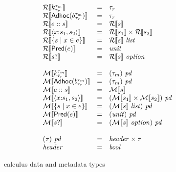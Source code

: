 \begin{figure}

\[
\begin{array}{lcl}
\repty{\Sk} & = & \tau_r \\
\repty{\SAdhoc{b}} & = & \tau_r \\
\repty{\SPath{e}{s}} & = & \repty{s} \\
\repty{\SPair{x}{s_1}{s_2}} & = & \repty{s_1} \times \repty{s_2} \\
\repty{\SSetComp{s}{x}{e}} & = & \repty{s}~\typ{list}  \\
\repty{\SPred{e}} & = & \typ{unit} \\
\repty{\SOption{s}} & = & \repty{s}~\typ{option}  \\
\\
\mdty{\Sk} & = & \pd{\tau_m} \\
\mdty{\SAdhoc{b}} & = & \pd{\tau_m} \\
\mdty{\SPath{e}{s}} & = & \mdty{s} \\
\mdty{\SPair{x}{s_1}{s_2}} & = & \pd{\mdty{s_1} \times \mdty{s_2}} \\
\mdty{\SSetComp{s}{x}{e}} & = & \pd{\mdty{s}~\typ{list}}  \\
\mdty{\SPred{e}} & = & \pd{\typ{unit}} \\
\mdty{\SOption{s}} & = & \pd{\mdty{s}~\typ{option}}  \\
\\
\pd{\tau} & = & \typ{header} \times \tau \\
\typ{header} & = & \typ{bool} 
\end{array}
\]

\caption{\forest{} calculus data and metadata types}
\label{fig:calculus-types}
\end{figure}





